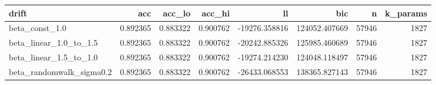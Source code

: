 \begin{tabular}{lrrrrrrr}
\toprule
drift & acc & acc\_lo & acc\_hi & ll & bic & n & k\_params \\
\midrule
beta\_const\_1.0 & 0.892365 & 0.883322 & 0.900762 & -19276.358816 & 124052.407669 & 57946 & 1827 \\
beta\_linear\_1.0\_to\_1.5 & 0.892365 & 0.883322 & 0.900762 & -20242.885326 & 125985.460689 & 57946 & 1827 \\
beta\_linear\_1.5\_to\_1.0 & 0.892365 & 0.883322 & 0.900762 & -19274.214230 & 124048.118497 & 57946 & 1827 \\
beta\_randomwalk\_sigma0.2 & 0.892365 & 0.883322 & 0.900762 & -26433.068553 & 138365.827143 & 57946 & 1827 \\
\bottomrule
\end{tabular}
